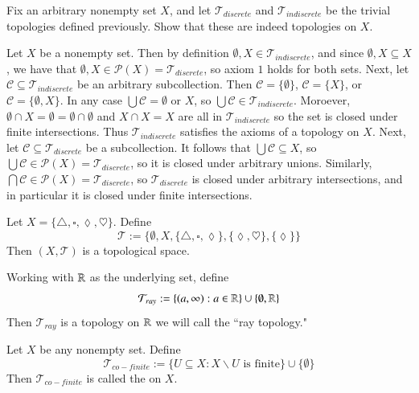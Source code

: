 \documentclass[12pt, a4paper, oneside, openright, titlepage]{book}
\begin{document}
\begin{xca}
    Fix an arbitrary nonempty set $X$, and let $\mathcal{T}_{discrete}$ and $\mathcal{T}_{indiscrete}$ be the trivial topologies defined previously. Show that these are indeed topologies on $X$.
\end{xca}
\begin{cust}[Solution]
    Let $X$ be a nonempty set. Then by definition $\emptyset, X \in \mathcal{T}_{indiscrete}$, and since $\emptyset,X \subseteq X$, we have that $\emptyset, X \in \mathcal{P}(X) = \mathcal{T}_{discrete}$, so axiom $1$ holds for both sets. Next, let $\mathcal{C} \subseteq \mathcal{T}_{indiscrete}$ be an arbitrary subcollection. Then $\mathcal{C} = \{\emptyset\}$, $\mathcal{C} = \{X\}$, or $\mathcal{C} = \{\emptyset, X\}$. In any case $\bigcup\mathcal{C} = \emptyset$ or $X$, so $\bigcup\mathcal{C} \in \mathcal{T}_{indiscrete}$. Moroever, $\emptyset\cap X = \emptyset = \emptyset \cap \emptyset$ and $X\cap X = X$ are all in $\mathcal{T}_{indiscrete}$ so the set is closed under finite intersections. Thus $\mathcal{T}_{indiscrete}$ satisfies the axioms of a topology on $X$. Next, let $\mathcal{C} \subseteq \mathcal{T}_{discrete}$ be a subcollection. It follows that $\bigcup\mathcal{C} \subseteq X$, so $\bigcup\mathcal{C} \in \mathcal{P}(X) = \mathcal{T}_{discrete}$, so it is closed under arbitrary unions. Similarly, $\bigcap\mathcal{C} \in \mathcal{P}(X) = \mathcal{T}_{discrete}$, so $\mathcal{T}_{discrete}$ is closed under arbitrary intersections, and in particular it is closed under finite intersections.
\end{cust}

\begin{eg}
    Let $X = \{\triangle, \square, \lozenge,\heartsuit\}$. Define $$\mathcal{T}:=\{\emptyset, X, \{\triangle, \square, \lozenge\}, \{\lozenge,\heartsuit\},\{\lozenge\}\}$$
    Then $(X,\mathcal{T})$ is a topological space.
\end{eg}

\begin{eg}
    Working with $\mathbb R$ as the underlying set, define \begin{equation*}
        \mathcal{T}_{ray} :=\{(a,\infty):a\in \mathbb R\}\cup\{\emptyset,\mathbb R\}
    \end{equation*}
    Then $\mathcal{T}_{ray}$ is a topology on $\mathbb R$ we will call the ``ray topology."
\end{eg}

\begin{eg}
    Let $X$ be any nonempty set. Define \begin{equation*}
        \mathcal{T}_{co-finite} := \{U \subseteq X:X\backslash U\text{ is finite}\}\cup\{\emptyset\}
    \end{equation*}
    Then $\mathcal{T}_{co-finite}$ is called the  on $X$.
\end{eg}
\end{document}
